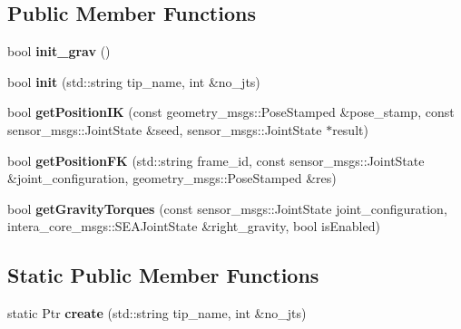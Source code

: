 \subsection*{Public Member Functions}
\begin{DoxyCompactItemize}
\item 
\hypertarget{classarm__kinematics_1_1_kinematics_aa53318ea68e673df71273f8567fed90b}{bool {\bfseries init\-\_\-grav} ()}\label{classarm__kinematics_1_1_kinematics_aa53318ea68e673df71273f8567fed90b}

\item 
\hypertarget{classarm__kinematics_1_1_kinematics_ad9ff5b8c53aa33f4aa32564d4fc46042}{bool {\bfseries init} (std\-::string tip\-\_\-name, int \&no\-\_\-jts)}\label{classarm__kinematics_1_1_kinematics_ad9ff5b8c53aa33f4aa32564d4fc46042}

\item 
\hypertarget{classarm__kinematics_1_1_kinematics_ae081313918aec2f76d00196b2cdd33a7}{bool {\bfseries get\-Position\-I\-K} (const geometry\-\_\-msgs\-::\-Pose\-Stamped \&pose\-\_\-stamp, const sensor\-\_\-msgs\-::\-Joint\-State \&seed, sensor\-\_\-msgs\-::\-Joint\-State $\ast$result)}\label{classarm__kinematics_1_1_kinematics_ae081313918aec2f76d00196b2cdd33a7}

\item 
\hypertarget{classarm__kinematics_1_1_kinematics_a8cc13d3c9ce515393f6060ef11f98345}{bool {\bfseries get\-Position\-F\-K} (std\-::string frame\-\_\-id, const sensor\-\_\-msgs\-::\-Joint\-State \&joint\-\_\-configuration, geometry\-\_\-msgs\-::\-Pose\-Stamped \&res)}\label{classarm__kinematics_1_1_kinematics_a8cc13d3c9ce515393f6060ef11f98345}

\item 
\hypertarget{classarm__kinematics_1_1_kinematics_a26bfc9b1d8355deb1483769ff21d495e}{bool {\bfseries get\-Gravity\-Torques} (const sensor\-\_\-msgs\-::\-Joint\-State joint\-\_\-configuration, intera\-\_\-core\-\_\-msgs\-::\-S\-E\-A\-Joint\-State \&right\-\_\-gravity, bool is\-Enabled)}\label{classarm__kinematics_1_1_kinematics_a26bfc9b1d8355deb1483769ff21d495e}

\end{DoxyCompactItemize}
\subsection*{Static Public Member Functions}
\begin{DoxyCompactItemize}
\item 
\hypertarget{classarm__kinematics_1_1_kinematics_a5bec450b4a863ba3981dfa846a57e54c}{static Ptr {\bfseries create} (std\-::string tip\-\_\-name, int \&no\-\_\-jts)}\label{classarm__kinematics_1_1_kinematics_a5bec450b4a863ba3981dfa846a57e54c}

\end{DoxyCompactItemize}


